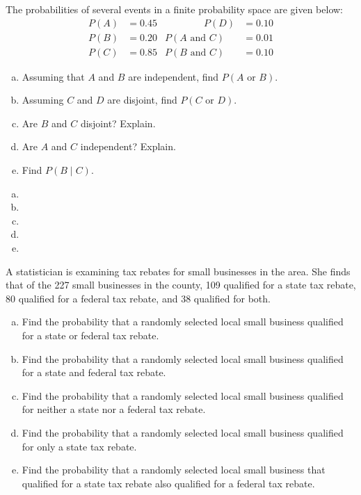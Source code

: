 \documentclass[11pt,letterpaper]{article}
\begin{document}

 The probabilities of several events in a finite probability space are given below:
	\[
	\begin{aligned}
	P(A)&= 0.45 &\qquad\qquad P(D)&= 0.10 \\
	P(B)&= 0.20 & P(A \text{ and } C)&= 0.01 \\
	P(C)&= 0.85 & P(B \text{ and } C)&= 0.10 
	\end{aligned}
	\] 
\begin{enumerate}[(a)]
\item Assuming that $A$ and $B$ are independent, find $P(A \text{ or } B)$.
\item Assuming $C$ and $D$ are disjoint, find $P(C \text{ or } D)$.
\item Are $B$ and $C$ disjoint? Explain.
\item Are $A$ and $C$ independent? Explain. 
\item Find $P(B \;|\; C)$.
\end{enumerate} \pspace

\sol 
\begin{enumerate}[(a)]
\item 
\item 
\item 
\item 
\item 
\end{enumerate}



\newpage



 A statistician is examining tax rebates for small businesses in the area. She finds that of the 227 small businesses in the county, 109 qualified for a state tax rebate, 80 qualified for a federal tax rebate, and 38 qualified for both. 
	\begin{enumerate}[(a)]
	\item Find the probability that a randomly selected local small business qualified for a state or federal tax rebate. 
	\item Find the probability that a randomly selected local small business qualified for a state and federal tax rebate. 
	\item Find the probability that a randomly selected local small business qualified for neither a state nor a federal tax rebate. 
	\item Find the probability that a randomly selected local small business qualified for only a state tax rebate. 
	\item Find the probability that a randomly selected local small business that qualified for a state tax rebate also qualified for a federal tax rebate. 
	\end{enumerate} \pspace
\end{document}
